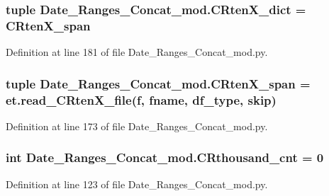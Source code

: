 \subsubsection[{C\+Rten\+X\+\_\+dict}]{\setlength{\rightskip}{0pt plus 5cm}tuple Date\+\_\+\+Ranges\+\_\+\+Concat\+\_\+mod.\+C\+Rten\+X\+\_\+dict = {\bf C\+Rten\+X\+\_\+span}}\label{namespace_date___ranges___concat__mod_a978f5d0373d453df68f135bdb1186308}


Definition at line 181 of file Date\+\_\+\+Ranges\+\_\+\+Concat\+\_\+mod.\+py.

\hypertarget{namespace_date___ranges___concat__mod_a96b8428f6b55ed287af44aaa3fcd747c}{}
\subsubsection[{C\+Rten\+X\+\_\+span}]{\setlength{\rightskip}{0pt plus 5cm}tuple Date\+\_\+\+Ranges\+\_\+\+Concat\+\_\+mod.\+C\+Rten\+X\+\_\+span = et.\+read\+\_\+\+C\+Rten\+X\+\_\+file({\bf f}, fname, {\bf df\+\_\+type}, {\bf skip})}\label{namespace_date___ranges___concat__mod_a96b8428f6b55ed287af44aaa3fcd747c}


Definition at line 173 of file Date\+\_\+\+Ranges\+\_\+\+Concat\+\_\+mod.\+py.

\hypertarget{namespace_date___ranges___concat__mod_a890e4737c0bb643c628cfc0ace517188}{}
\subsubsection[{C\+Rthousand\+\_\+cnt}]{\setlength{\rightskip}{0pt plus 5cm}int Date\+\_\+\+Ranges\+\_\+\+Concat\+\_\+mod.\+C\+Rthousand\+\_\+cnt = 0}\label{namespace_date___ranges___concat__mod_a890e4737c0bb643c628cfc0ace517188}


Definition at line 123 of file Date\+\_\+\+Ranges\+\_\+\+Concat\+\_\+mod.\+py.

\hypertarget{namespace_date___ranges___concat__mod_aed55c0f2337263c5b111a95e50e59ff0}{}
